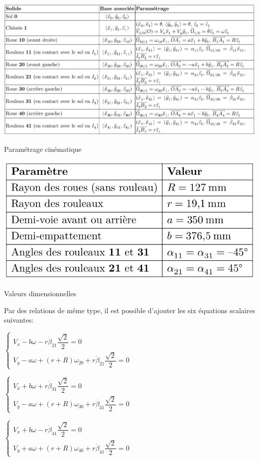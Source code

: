\begin{table}[!ht]
\begin{center}
 \includegraphics[width=\linewidth]{img/tab01.png}
  \caption{Paramétrage cinématique}
\label{tab01}
\vspace{0.5cm}
 \includegraphics[width=0.5\linewidth]{img/tab02.png}
  \caption{Valeurs dimensionnelles}
\label{tab02}
 \end{center}
\end{table}

\newpage

Par des relations de même type, il est possible d'ajouter les six équations scalaires suivantes:

\begin{center}
\begin{math}
\left\{\begin{array}{l}
V_x-b\omega-r\dot{\beta}_{21}\dfrac{\sqrt{2}}{2}=0\\
V_y-a\omega+(r+R)\omega_{20}+r\dot{\beta}_{21}\dfrac{\sqrt{2}}{2}=0
\end{array}\right.
\end{math}

\begin{math}
\left\{\begin{array}{l}
V_x+b\omega+r\dot{\beta}_{31}\dfrac{\sqrt{2}}{2}=0\\
V_y-a\omega+(r+R)\omega_{30}+r\dot{\beta}_{31}\dfrac{\sqrt{2}}{2}=0
\end{array}\right.
\end{math}

\begin{math}
\left\{\begin{array}{l}
V_x+b\omega-r\dot{\beta}_{41}\dfrac{\sqrt{2}}{2}=0\\
V_y+a\omega+(r+R)\omega_{40}+r\dot{\beta}_{41}\dfrac{\sqrt{2}}{2}=0
\end{array}\right.
\end{math}
\end{center}

